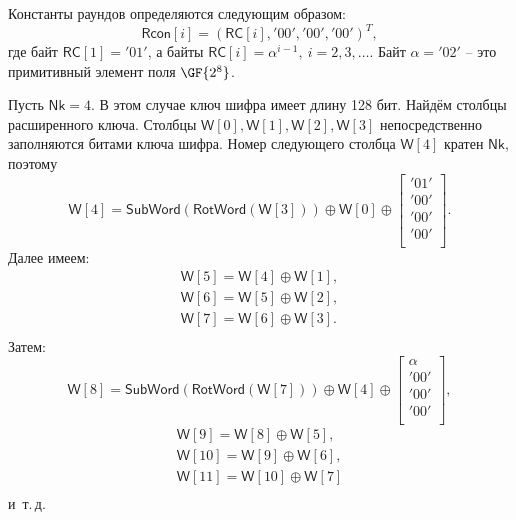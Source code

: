 Константы раундов определяются следующим образом:
    \[ \mathsf{Rcon}[i] = (\mathsf{RC}[i], \mathrm{'00'}, \mathrm{'00'}, \mathrm{'00'})^T, \]
где байт $\mathsf{RC}[1] = \mathrm{'01'}$, а байты $\mathsf{RC}[i] = \alpha^{i-1}, ~ i = 2, 3, \dots$. Байт $\alpha = \mathrm{'02'}$ -- это примитивный элемент поля $\GF{2^8}$.

\example
Пусть $\mathsf{Nk} = 4$. В этом случае ключ шифра имеет длину 128 бит. Найдём столбцы расширенного ключа. Столбцы $\mathsf{W}[0], \mathsf{W}[1], \mathsf{W}[2], \mathsf{W}[3]$ непосредственно заполняются битами ключа шифра. Номер следующего столбца $\mathsf{W}[4]$ кратен $\mathsf{Nk}$, поэтому
\[
    \mathsf{W}[4] = \mathsf{SubWord}(\mathsf{RotWord}(\mathsf{W}[3])) \oplus \mathsf{W}[0] \oplus
        \left[ \begin{array}{c}
            \mathrm{'01'} \\ \mathrm{'00'} \\ \mathrm{'00'} \\ \mathrm{'00'} \\
        \end{array} \right].
\]
Далее имеем:
\[
    \begin{array}{l}
        \mathsf{W}[5] = \mathsf{W}[4] \oplus \mathsf{W}[1], \\
        \mathsf{W}[6] = \mathsf{W}[5] \oplus \mathsf{W}[2], \\
        \mathsf{W}[7] = \mathsf{W}[6] \oplus \mathsf{W}[3].  \\
    \end{array}
\]
Затем:
\[
    \mathsf{W}[8] = \mathsf{SubWord}(\mathsf{RotWord}(\mathsf{W}[7])) \oplus \mathsf{W}[4] \oplus
        \left[ \begin{array}{c}
            \alpha \\
            \mathrm{'00'}\\
            \mathrm{'00'}\\
            \mathrm{'00'}\\
        \end{array} \right] ,
\] \[
    \begin{array}{l}
        \mathsf{W}[9] = \mathsf{W}[8] \oplus \mathsf{W}[5], \\
        \mathsf{W}[10] = \mathsf{W}[9] \oplus \mathsf{W}[6], \\
        \mathsf{W}[11] = \mathsf{W}[10] \oplus \mathsf{W}[7] \\
    \end{array}
\]
и~т.\,д.
\exampleend

